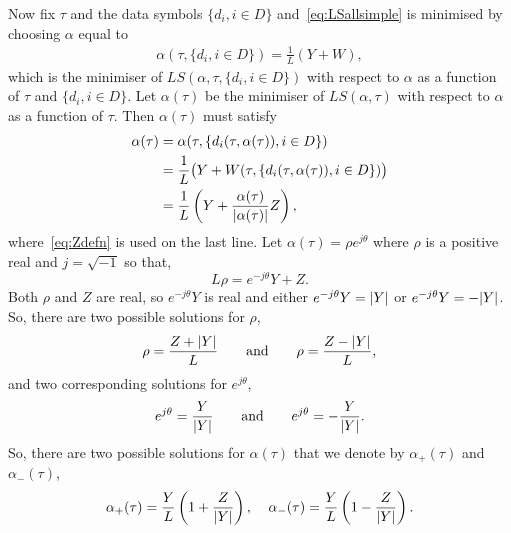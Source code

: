 \documentclass[journal]{IEEEtranTCOM}
\begin{document}
Now fix $\tau$ and the data symbols $\{d_i, i \in D\}$ and~\eqref{eq:LSallsimple} is minimised by choosing $\alpha$ equal to
\begin{align*}
\alpha(\tau, \{d_i, i \in D\}) = \frac{1}{L}( Y + W ),
\end{align*}
which is the minimiser of $LS(\alpha,\tau,\{d_i, i \in D\})$ with respect to $\alpha$ as a function of $\tau$ and $\{d_i, i \in D\}$.  Let $\alpha(\tau)$ be the minimiser of $LS(\alpha, \tau)$ with respect to $\alpha$ as a function of $\tau$.  Then $\alpha(\tau)$ must satisfy 
\begin{align*}
\alpha(\tau) &= \alpha(\tau,\{d_i(\tau,\alpha(\tau)), i \in D\}) \\
&= \frac{1}{L}\big( Y + W(\tau,\{d_i(\tau,\alpha(\tau)), i \in D\}) \big) \\
&= \frac{1}{L}\left( Y + \frac{\alpha(\tau)}{{\left\vert \alpha(\tau) \right\vert}}Z \right), 
\end{align*} 
where~\eqref{eq:Zdefn} is used on the last line.  Let $\alpha(\tau) = \rho e^{j\theta}$ where $\rho$ is a positive real and $j = \sqrt{-1}$ so that,
\[ 
L\rho = e^{-j\theta} Y + Z.
\]
Both $\rho$ and $Z$ are real, so $e^{-j\theta} Y$ is real and either $e^{-j\theta} Y = {\left\vert Y \right\vert}$ or $e^{-j\theta} Y = -{\left\vert Y \right\vert}$.  So, there are two possible solutions for $\rho$,
\[
\rho = \frac{ Z + {\left\vert Y \right\vert}}{L} \qquad \text{and} \qquad \rho = \frac{Z - {\left\vert Y \right\vert}}{L},
\]
and two corresponding solutions for $e^{j\theta}$,
\[
e^{j\theta} = \frac{Y}{{\left\vert Y \right\vert}} \qquad \text{and} \qquad e^{j\theta} = -\frac{Y}{{\left\vert Y \right\vert}}.
\]
So, there are two possible solutions for $\alpha(\tau)$ that we denote by $\alpha_{+}(\tau)$ and $\alpha_{-}(\tau)$,
\begin{equation}\label{eq:eqsovled}
\alpha_+(\tau) = \frac{Y}{L}\left( 1 + \frac{Z}{\abs{Y}} \right), \;\;\;\; \alpha_-(\tau) = \frac{Y}{L}\left( 1 - \frac{Z}{\abs{Y}} \right).
\end{equation}
\end{document}
